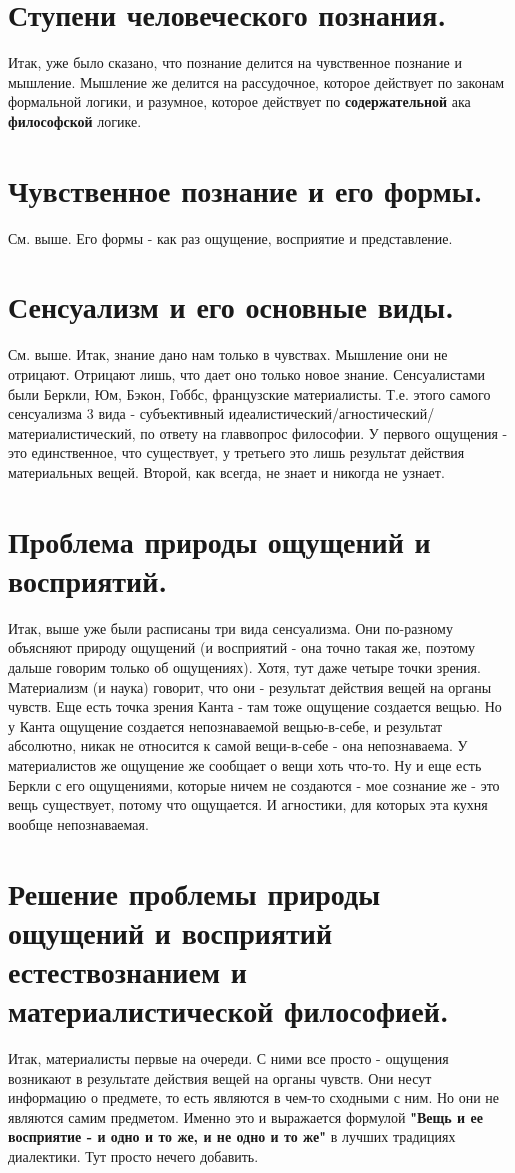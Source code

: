 \section{ Ступени человеческого познания.}
Итак, уже было сказано, что познание делится на чувственное познание и мышление. Мышление же делится на рассудочное, которое действует по законам формальной логики, и разумное, которое действует по \textbf{содержательной} ака \textbf{философской} логике.

\section{ Чувственное познание и его формы.}
См. выше. Его формы - как раз ощущение, восприятие и представление.

\section{ Сенсуализм и его основные виды.}
См. выше. Итак, знание дано нам только в чувствах. Мышление они не отрицают. Отрицают лишь, что дает оно только новое знание. Сенсуалистами были Беркли, Юм, Бэкон, Гоббс, французские материалисты.  Т.е. этого самого сенсуализма 3 вида - субъективный идеалистический/агностический/материалистический, по ответу на главвопрос философии. У первого ощущения - это единственное, что существует, у третьего это лишь результат действия материальных вещей. Второй, как всегда, не знает и никогда не узнает.

\section{ Проблема природы ощущений и восприятий.}
Итак, выше уже были расписаны три вида сенсуализма. Они по-разному объясняют природу ощущений (и восприятий - она точно такая же, поэтому дальше говорим только об ощущениях). Хотя, тут даже четыре точки зрения. Материализм (и наука) говорит, что они - результат действия вещей на органы чувств. Еще есть точка зрения Канта - там тоже ощущение создается вещью. Но у Канта ощущение создается непознаваемой вещью-в-себе, и результат абсолютно, никак не относится к самой вещи-в-себе - она непознаваема. У материалистов же ощущение же сообщает о вещи хоть что-то. Ну и еще есть Беркли с его ощущениями, которые ничем не создаются - мое сознание же - это вещь существует, потому что ощущается. И агностики, для которых эта кухня вообще непознаваемая.

\section{ Решение проблемы природы ощущений и восприятий естествознанием и материалистической философией.}
Итак, материалисты первые на очереди. С ними все просто - ощущения возникают в результате действия вещей на органы чувств. Они несут информацию о предмете, то есть являются в чем-то сходными с ним. Но они не являются самим предметом. Именно это и выражается формулой \textbf{"Вещь и ее восприятие - и одно и то же, и не одно и то же"} в лучших традициях диалектики. Тут просто нечего добавить.


